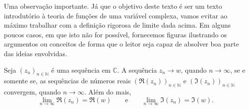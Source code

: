 Uma observação importante. 
Já que o objetivo deste texto é ser um texto introdutório à teoria de funções de uma variável complexa, 
vamos evitar ao máximo trabalhar com a definição rigorosa de limite dada acima. Em alguns poucos 
casos, em que isto não for possível, fornecemos figuras ilustrando os argumentos ou conceitos de forma que 
o leitor seja capaz de absolver boa parte das ideias envolvidas.
 
\begin{lema}
\label{lema-conv-parte-real-im-seq}
Seja $(z_n)_{n\in\mathbb{N}}$ é uma
sequência em $\mathbb{C}$. A sequência $z_n\to w$, quando $n\to \infty$, se e somente
se, as sequências de números reais $(\Re(z_n))_{n\in\mathbb{N}}$ e $(\Im(z_n))_{n\in\mathbb{N}}$ convergem, quando $n\to\infty$. Além do mais,
\[
\lim_{n\to\infty} \Re(z_n) = \Re(w)
\qquad \text{e} \qquad 
\lim_{n\to\infty} \Im(z_n) = \Im(w).
\]
\end{lema} 



